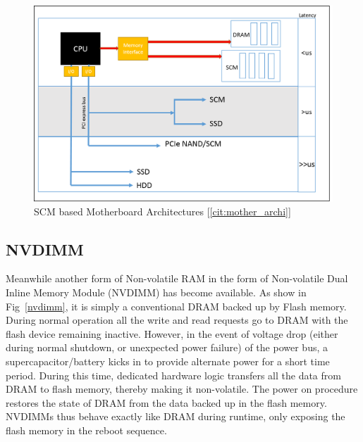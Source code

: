 \begin{figure}[H]
  \centering
  \includegraphics[scale=0.7]{figures/new_mem_arch.png}
  \caption{SCM based Motherboard Architectures [\ref{cit:mother_archi}]}
  \label{fig:new_arch}
\end{figure}

\subsection{NVDIMM}
Meanwhile another form of Non-volatile RAM in the form of Non-volatile Dual Inline Memory Module (NVDIMM) has become available. As show in Fig~\ref{nvdimm}, it is simply a conventional DRAM backed up by Flash memory. During normal operation all the write and read requests go to DRAM with the flash device remaining inactive. However, in the event of voltage drop (either during normal shutdown, or unexpected power failure) of the power bus, a supercapacitor/battery kicks in to provide alternate power for a short time period. During this time, dedicated hardware logic transfers all the data from DRAM to flash memory, thereby making it non-volatile. The power on procedure restores the state of DRAM from the data backed up in the flash memory. NVDIMMs thus behave exactly like DRAM during runtime, only exposing the flash memory in the reboot sequence. 

\setlength{\belowcaptionskip}{-10pt}

